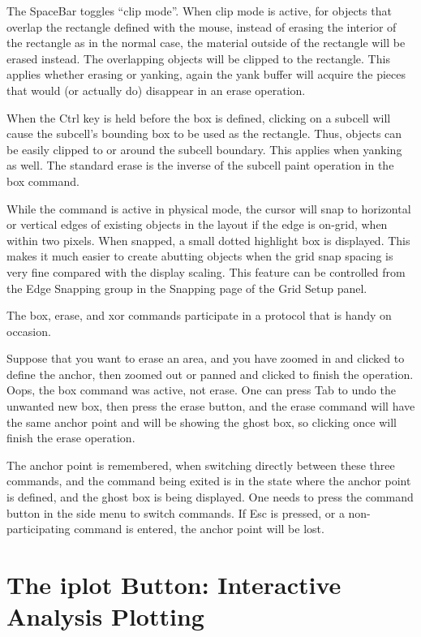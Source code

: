 The {\cb SpaceBar} toggles ``clip mode''.  When clip mode is active,
for objects that overlap the rectangle defined with the mouse, instead
of erasing the interior of the rectangle as in the normal case, the
material outside of the rectangle will be erased instead.  The
overlapping objects will be clipped to the rectangle.  This applies
whether erasing or yanking, again the yank buffer will acquire the
pieces that would (or actually do) disappear in an erase operation.

When the {\kb Ctrl} key is held before the box is defined, clicking on
a subcell will cause the subcell's bounding box to be used as the
rectangle.  Thus, objects can be easily clipped to or around the
subcell boundary.  This applies when yanking as well.  The standard
erase is the inverse of the subcell paint operation in the {\cb box}
command.

While the command is active in physical mode, the cursor will snap to
horizontal or vertical edges of existing objects in the layout if the
edge is on-grid, when within two pixels.  When snapped, a small dotted
highlight box is displayed.  This makes it much easier to create
abutting objects when the grid snap spacing is very fine compared with
the display scaling.  This feature can be controlled from the {\cb
Edge Snapping} group in the {\cb Snapping} page of the {\cb Grid
Setup} panel.

The {\cb box}, {\cb erase}, and {\cb xor} commands participate in a
protocol that is handy on occasion.

Suppose that you want to erase an area, and you have zoomed in and
clicked to define the anchor, then zoomed out or panned and clicked to
finish the operation.  Oops, the {\cb box} command was active, not
{\cb erase}.  One can press {\kb Tab} to undo the unwanted new box,
then press the {\cb erase} button, and the {\cb erase} command will
have the same anchor point and will be showing the ghost box, so
clicking once will finish the erase operation.

The anchor point is remembered, when switching directly between these
three commands, and the command being exited is in the state where the
anchor point is defined, and the ghost box is being displayed.  One
needs to press the command button in the side menu to switch commands. 
If {\kb Esc} is pressed, or a non-participating command is entered,
the anchor point will be lost.


\section{The {\cb iplot} Button: Interactive Analysis Plotting}

